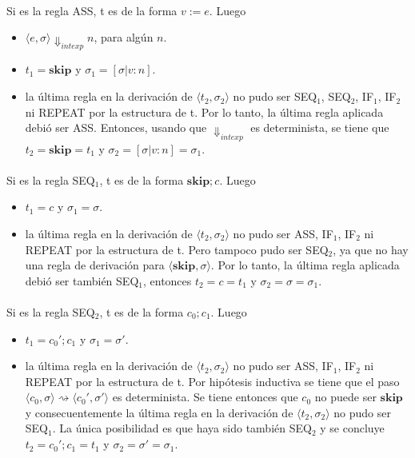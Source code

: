 \documentclass{article}
\begin{document}
\paragraph{}
Si es la regla ASS, t es de la forma $v:=e$. Luego
\begin{itemize}
\item
$\langle e, \sigma \rangle \Downarrow_{intexp} n$, para alg\'un $n$.
\item
$t_1 = \mathbf{skip}$ y $\sigma_1 = [ \sigma | v : n ]$.
\item
la \'ultima regla en la derivaci\'on de $\langle t_2, \sigma_2 \rangle$ no pudo ser SEQ$_1$, SEQ$_2$, IF$_1$, IF$_2$ ni REPEAT por la estructura de t. Por lo tanto, la \'ultima regla aplicada debi\'o ser ASS. Entonces, usando que $\Downarrow_{intexp}$ es determinista, se tiene que $t_2 = \mathbf{skip} = t_1$ y $\sigma_2 = [ \sigma | v : n ] = \sigma_1$.
\end{itemize}

\paragraph{}
Si es la regla SEQ$_1$, t es de la forma $\mathbf{skip};c$. Luego
\begin{itemize}
\item
$t_1 = c$ y $\sigma_1 = \sigma$.
\item
la \'ultima regla en la derivaci\'on de $\langle t_2, \sigma_2 \rangle$ no pudo ser ASS, IF$_1$, IF$_2$ ni REPEAT por la estructura de t. Pero tampoco pudo ser SEQ$_2$, ya que no hay una regla de derivaci\'on para $\langle \mathbf{skip}, \sigma \rangle$. Por lo tanto, la \'ultima regla aplicada debi\'o ser tambi\'en SEQ$_1$, entonces $ t_2 = c = t_1$ y $\sigma_2 = \sigma = \sigma_1$.
\end{itemize}

\paragraph{}
Si es la regla SEQ$_2$, t es de la forma $c_0;c_1$. Luego
\begin{itemize}
\item
$t_1 = c_0';c_1 $ y $ \sigma_1 = \sigma'$.
\item
la \'ultima regla en la derivaci\'on de $ \langle t_2, \sigma_2 \rangle $ no pudo ser ASS, IF$_1$, IF$_2$ ni REPEAT por la estructura de t. Por hip\'otesis inductiva se tiene que el paso $\langle c_0, \sigma \rangle \rightsquigarrow \langle c_0',  \sigma' \rangle$ es determinista. Se tiene entonces que $c_0$ no puede ser $ \mathbf{skip}$ y consecuentemente la \'ultima regla en la derivaci\'on de $\langle t_2, \sigma_2 \rangle$ no pudo ser SEQ$_1$. La \'unica posibilidad es que haya sido tambi\'en SEQ$_2$ y se concluye $t_2 = c_0';c_1 = t_1$ y $\sigma_2 = \sigma' = \sigma_1$. 
\end{itemize}
\end{document}
